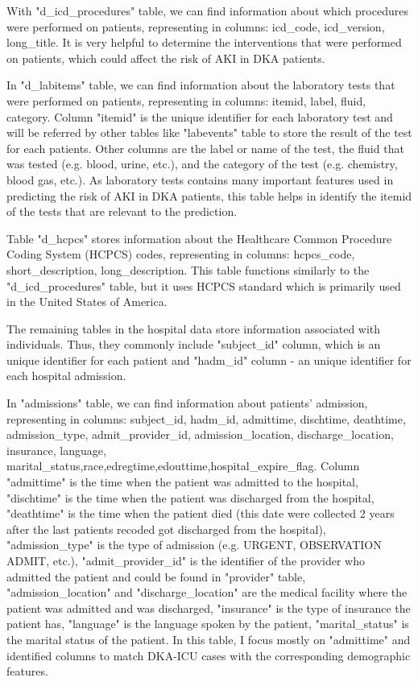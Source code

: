 \documentclass[../main.tex]{subfiles}
\begin{document}
With "d\_icd\_procedures" table, we can find information about which procedures were performed on patients, representing in columns: icd\_code, icd\_version, long\_title.
It is very helpful to determine the interventions that were performed on patients, which could affect the risk of AKI in DKA patients.

In "d\_labitems" table, we can find information about the laboratory tests that were performed on patients, representing in columns: itemid, label, fluid, category. Column "itemid" is the unique identifier for each laboratory test and will be referred by other tables like "labevents" table to store the result of the test for each patients. Other columns are the label or name of the test, the fluid that was tested (e.g. blood, urine, etc.), and the category of the test (e.g. chemistry, blood gas, etc.).
As laboratory tests contains many important features used in predicting the risk of AKI in DKA patients, this table helps in identify the itemid of the tests that are relevant to the prediction.

Table "d\_hcpcs" stores information about the Healthcare Common Procedure Coding System (HCPCS) codes, representing in columns: hcpcs\_code, short\_description, long\_description.
This table functions similarly to the "d\_icd\_procedures" table, but it uses HCPCS standard which is primarily used in the United States of America.

The remaining tables in the hospital data store information associated with individuals.
Thus, they commonly include "subject\_id" column, which is an unique identifier for each patient and "hadm\_id" column - an unique identifier for each hospital admission.

In "admissions" table, we can find information about patients' admission, representing in columns: subject\_id, hadm\_id, admittime, dischtime, deathtime, admission\_type, admit\_provider\_id, admission\_location, discharge\_location, insurance, language, marital\_status,race,edregtime,edouttime,hospital\_expire\_flag.
Column "admittime" is the time when the patient was admitted to the hospital,
"dischtime" is the time when the patient was discharged from the hospital,
"deathtime" is the time when the patient died (this date were collected 2 years after the last patients recoded got discharged from the hospital),
"admission\_type" is the type of admission (e.g. URGENT, OBSERVATION ADMIT, etc.),
"admit\_provider\_id" is the identifier of the provider who admitted the patient and could be found in "provider" table,
"admission\_location" and "discharge\_location" are the medical facility where the patient was admitted and was discharged,
"insurance" is the type of insurance the patient has,
"language" is the language spoken by the patient,
"marital\_status" is the marital status of the patient.
In this table, I focus mostly on "admittime" and identified columns to match DKA-ICU cases with the corresponding demographic features.
\end{document}
